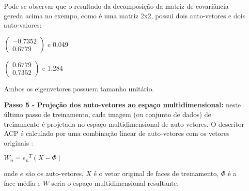 Pode-se observar que o resultado da decomposição da matriz de covariância gereda acima no exempo, como é uma matriz 2x2, possui dois auto-vetores e dois auto-valores:
\begin{center}
	$\begin{pmatrix} -0.7352 \\ 0.6779 \end{pmatrix}$  e 0.049
	
	$\begin{pmatrix} 0.6779 \\ 0.7352 \end{pmatrix}$  e 1.284
\end{center}
Ambos os eigenvetores possuem tamanho unitário.


\textbf{Passo 5 - Projeção dos auto-vetores ao espaço multidimensional:}  neste último passo de treinamento, cada imagem (ou conjunto de dados) de treinamento é projetada no espaço multidimensional de auto-vetores. O descritor ACP é calculado por uma combinação linear de auto-vetores com os vetores originais \cite{geysilva}:
\begin{center}
	$W_n = {e_n}^T (X - \Phi)$	
\end{center}
onde $e$ são os auto-vetores, $X$ é o vetor original de faces de treinamento, $\Phi$ é a face média e $W$ seria o espaço multidimensional resultante.







